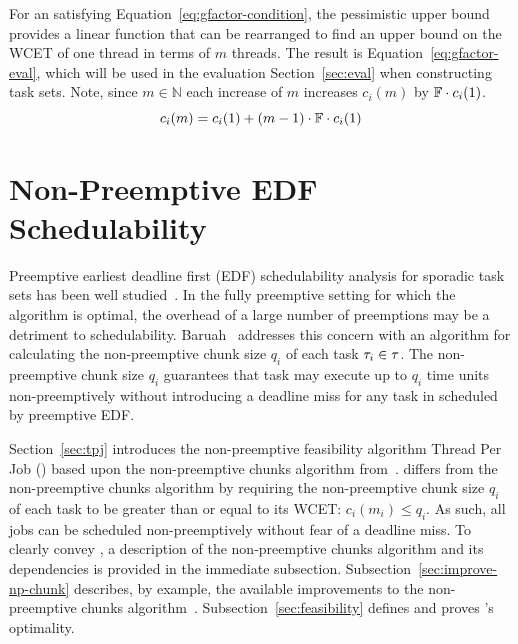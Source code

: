 \documentclass[a4paper,UKenglish,cleveref,autoref,english]{lipics-v2019}
\begin{document}
For an \GFactor{} satisfying Equation~\ref{eq:gfactor-condition}, the
pessimistic upper bound provides a linear function that can be
rearranged to find an upper bound on the WCET of one thread in terms
of ${m}$ threads. 
The result is Equation~\ref{eq:gfactor-eval}, which will be
used in the evaluation Section~\ref{sec:eval} when constructing
task sets. Note, since ${m \in \mathbb{N}}$ each increase of ${m}$ 
increases ${c_i(m)}$ by ${\mathbb{F}{} \cdot c_i(1)}$.
\begin{equation}
  \label{eq:gfactor-eval}
  c_i(m) = c_i(1) + (m - 1) \cdot \mathbb{F}{} \cdot c_i(1)
\end{equation}

\section{Non-Preemptive EDF Schedulability}
\label{sec:schedulability}

Preemptive earliest deadline first (EDF) schedulability analysis for
sporadic task sets has been well
studied~\cite{Liu:1973,Baruah:1990,George:1996}. In the fully 
preemptive setting for which the algorithm is optimal, the
overhead of a large number of preemptions may be a detriment to
schedulability. Baruah~\cite{Baruah:2005} addresses this concern with
an algorithm for calculating the non-preemptive chunk size ${q_i}$ of
each task ${\tau_{i} \in \tau}$. The non-preemptive chunk size
${q_i}$ guarantees that task  may execute up to ${q_i}$ time
units non-preemptively without introducing a deadline miss for any
task in \tasks{} scheduled by preemptive EDF.

Section~\ref{sec:tpj} introduces the non-preemptive feasibility algorithm
Thread Per Job (\tpj) based upon the non-preemptive chunks algorithm
from~\cite{Baruah:2005}. \tpj{} differs from the non-preemptive chunks
algorithm by requiring the non-preemptive chunk size ${q_i}$ of each
task  to be greater than or equal to its WCET: ${c_i(m_i) \le
  q_i}$. As such, all jobs can be scheduled non-preemptively without
fear of a deadline miss. To clearly convey \tpj{}, a description of
the non-preemptive chunks algorithm and its dependencies is provided
in the immediate subsection. Subsection~\ref{sec:improve-np-chunk}
describes, by example, the available improvements to the
non-preemptive chunks algorithm~\cite{Baruah:2005}.
Subsection~\ref{sec:feasibility} defines and proves \tpj{}'s
optimality.
\end{document}

